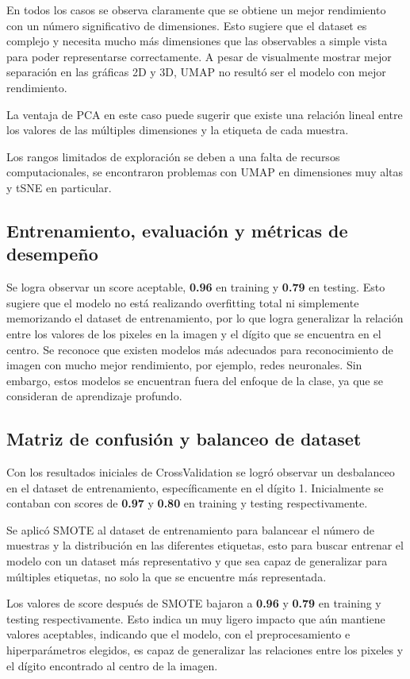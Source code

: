 \documentclass[journal]{IEEEtran}
\begin{document}
En todos los casos se observa claramente que se obtiene un mejor rendimiento con un número significativo de dimensiones. Esto sugiere que el dataset es complejo y necesita mucho más dimensiones que las observables a simple vista para poder representarse correctamente. A pesar de visualmente mostrar mejor separación en las gráficas 2D y 3D, UMAP no resultó ser el modelo con mejor rendimiento.

La ventaja de PCA en este caso puede sugerir que existe una relación lineal entre los valores de las múltiples dimensiones y la etiqueta de cada muestra. 

Los rangos limitados de exploración se deben a una falta de recursos computacionales, se encontraron problemas con UMAP en dimensiones muy altas y tSNE en particular.

\subsection{Entrenamiento, evaluación y métricas de desempeño}
Se logra observar un score aceptable, \textbf{0.96} en training y \textbf{0.79} en testing. Esto sugiere que el modelo no está realizando overfitting total ni simplemente memorizando el dataset de entrenamiento, por lo que logra generalizar la relación entre los valores de los pixeles en la imagen y el dígito que se encuentra en el centro. Se reconoce que existen modelos más adecuados para reconocimiento de imagen con mucho mejor rendimiento, por ejemplo, redes neuronales. Sin embargo, estos modelos se encuentran fuera del enfoque de la clase, ya que se consideran de aprendizaje profundo.

\subsection{Matriz de confusión y balanceo de dataset}
Con los resultados iniciales de CrossValidation se logró observar un desbalanceo en el dataset de entrenamiento, específicamente en el dígito 1. Inicialmente se contaban con scores de \textbf{0.97} y \textbf{0.80} en training y testing respectivamente.

Se aplicó SMOTE al dataset de entrenamiento para balancear el número de muestras y la distribución en las diferentes etiquetas, esto para buscar entrenar el modelo con un dataset más representativo y que sea capaz de generalizar para múltiples etiquetas, no solo la que se encuentre más representada.

Los valores de score después de SMOTE bajaron a \textbf{0.96} y \textbf{0.79} en training y testing respectivamente. Esto indica un muy ligero impacto que aún mantiene valores aceptables, indicando que el modelo, con el preprocesamiento e hiperparámetros elegidos, es capaz de generalizar las relaciones entre los pixeles y el dígito encontrado al centro de la imagen.
\end{document}
